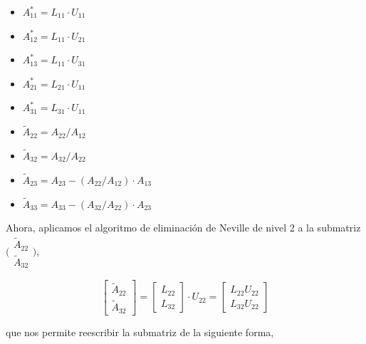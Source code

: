\documentclass[a4paper,12pt]{article}
\begin{document}
\begin{multicols}{2}
	\begin{itemize}
		\item $A_{11}^{*} = L_{11}\cdot U_{11}$
		\item $A_{12}^{*} = L_{11}\cdot U_{21}$
		\item $A_{13}^{*} = L_{11}\cdot U_{31}$
		\item $A_{21}^{*} = L_{21}\cdot U_{11}$
		\item $A_{31}^{*} = L_{31}\cdot U_{11}$
	\end{itemize}
	\begin{itemize}
		\item $\widetilde{A}_{22} = A_{22}/A_{12}$
		\item $\widetilde{A}_{32} = A_{32}/A_{22}$
		\item $\widetilde{A}_{23} = A_{23} - (A_{22}/A_{12})\cdot A_{13}$
		\item $\widetilde{A}_{33} = A_{33} - (A_{32}/A_{22})\cdot A_{23}$
	\end{itemize}
\end{multicols}

\bigskip

Ahora, aplicamos el algoritmo de eliminaci\'on de Neville de nivel 2 a la submatriz $\bigl(\begin{smallmatrix}
\widetilde{A}_{22}\\ \widetilde{A}_{32}
\end{smallmatrix} \bigr)$,

\begin{equation}
	\begin{bmatrix}
		\widetilde{A}_{22} \\
		\widetilde{A}_{32}
	\end{bmatrix}
	=
	\begin{bmatrix}
		L_{22} \\
		L_{32}
	\end{bmatrix}
	\cdot
	U_{22}
	=
	\begin{bmatrix}
		L_{22} U_{22} \\
		L_{32} U_{22}
	\end{bmatrix}
\end{equation}

que nos permite reescribir la submatriz de la siguiente forma,
\end{document}
